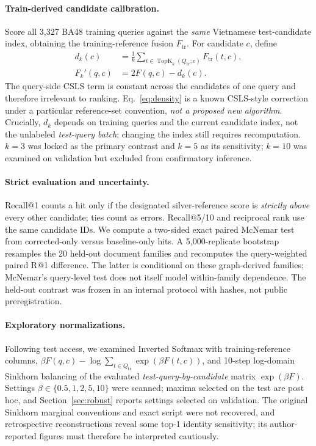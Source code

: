 \paragraph{Train-derived candidate calibration.} Score all 3,327 BA48 training queries against the \emph{same} Vietnamese test-candidate index, obtaining the training-reference fusion $F_{\mathrm{tr}}$. For candidate $c$, define
\begin{equation}
\begin{aligned}
 d_k(c)&=\frac1k\sum_{t\in\operatorname{TopK}_k(Q_{\mathrm{tr}};c)}F_{\mathrm{tr}}(t,c),\\[-1mm]
 F_k'(q,c)&=2F(q,c)-d_k(c).
\end{aligned}
\label{eq:density}
\end{equation}
The query-side CSLS term is constant across the candidates of one query and therefore irrelevant to ranking. Eq.~\ref{eq:density} is a known CSLS-style correction under a particular reference-set convention, \emph{not a proposed new algorithm}. Crucially, $d_k$ depends on training queries and the current candidate index, not the unlabeled \emph{test-query batch}; changing the index still requires recomputation. $k=3$ was locked as the primary contrast and $k=5$ as its sensitivity; $k=10$ was examined on validation but excluded from confirmatory inference.

\paragraph{Strict evaluation and uncertainty.} Recall@1 counts a hit only if the designated silver-reference score is \emph{strictly above} every other candidate; ties count as errors. Recall@5/10 and reciprocal rank use the same candidate IDs. We compute a two-sided exact paired McNemar test from corrected-only versus baseline-only hits. A 5,000-replicate bootstrap resamples the 20 held-out document families and recomputes the query-weighted paired R@1 difference. The latter is conditional on these graph-derived families; McNemar's query-level test does not itself model within-family dependence. The held-out contrast was frozen in an internal protocol with hashes, not public preregistration.

\paragraph{Exploratory normalizations.} Following test access, we examined Inverted Softmax with training-reference columns, $\beta F(q,c)-\log\sum_{t\in Q_{\mathrm{tr}}}\exp(\beta F(t,c))$, and 10-step log-domain Sinkhorn balancing of the evaluated \emph{test-query-by-candidate} matrix $\exp(\beta F)$. Settings $\beta\in\{0.5,1,2,5,10\}$ were scanned; maxima selected on the test are post hoc, and Section~\ref{sec:robust} reports settings selected on validation. The original Sinkhorn marginal conventions and exact script were not recovered, and retrospective reconstructions reveal some top-1 identity sensitivity; its author-reported figures must therefore be interpreted cautiously.
